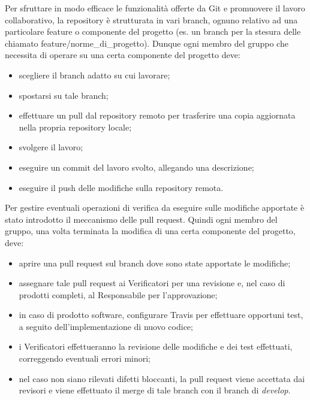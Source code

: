         Per sfruttare in modo efficace le funzionalità offerte da Git e promuovere il lavoro collaborativo, la repository è strutturata in vari branch, ognuno relativo ad una particolare feature o componente del progetto (es. un branch per la stesura delle \NdP{} chiamato feature/norme\_di\_progetto). Dunque ogni membro del gruppo che necessita di operare su una certa componente del progetto deve:
        \begin{itemize}
          \item scegliere il branch adatto su cui lavorare;
          \item spostarsi su tale branch;
          \item effettuare un pull dal repository remoto per trasferire una copia aggiornata nella propria repository locale;
          \item svolgere il lavoro;
          \item eseguire un commit del lavoro svolto, allegando una descrizione;
          \item eseguire il push delle modifiche sulla repository remota.
        \end{itemize}
    	Per gestire eventuali operazioni di verifica da eseguire sulle modifiche apportate è stato introdotto il meccanismo delle pull request. Quindi ogni membro del gruppo, una volta terminata la modifica di una certa componente del progetto, deve:
    	\begin{itemize}
    		\item aprire una pull request sul branch dove sono state apportate le modifiche;
    		\item assegnare tale pull request ai Verificatori per una revisione e, nel caso di prodotti completi, al Responsabile per l'approvazione;
    		\item in caso di prodotto software, configurare Travis per effettuare opportuni test, a seguito dell'implementazione di nuovo codice;
    		\item i Verificatori effettueranno la revisione delle modifiche e dei test effettuati, correggendo eventuali errori minori;
    		\item nel caso non siano rilevati difetti bloccanti, la pull request viene accettata dai revisori e viene effettuato il merge di tale branch con il branch di \textit{develop}.
    	\end{itemize}

